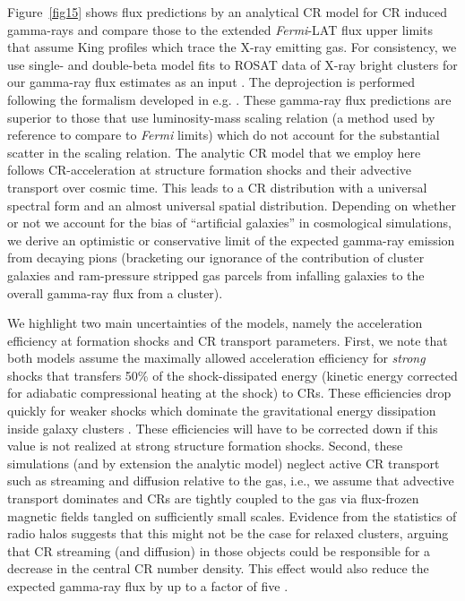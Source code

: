 \documentclass[10pt,aps,pra,reprint,amsmath,amsfonts,amssymb,showpacs,nofootinbib,floatfix]{revtex4-1}
\newcommand{\Fermi}{{\em Fermi}\xspace}
\begin{document}
Figure~\ref{fig15} shows flux predictions by an analytical CR model
\cite{2010MNRAS.409..449P} for CR induced gamma-rays and compare those
to the extended \Fermi-LAT flux upper limits that assume King profiles
which trace the X-ray emitting gas. For consistency, we use single-
and double-beta model fits to ROSAT data of X-ray bright clusters for
our gamma-ray flux estimates as an input
\cite{2007A&A...466..805C}. The deprojection is performed following
the formalism developed in e.g. \cite{2004A&A...413...17P}. These
gamma-ray flux predictions are superior to those that use
luminosity-mass scaling relation (a method used by reference
\cite{2010ApJ...717L..71A} to compare to \Fermi limits) which do not
account for the substantial scatter in the scaling relation. The
analytic CR model that we employ here follows CR-acceleration at
structure formation shocks and their advective transport over cosmic
time. This leads to a CR distribution with a universal spectral form
and an almost universal spatial distribution. Depending on whether or
not we account for the bias of ``artificial galaxies'' in cosmological
simulations, we derive an optimistic or conservative limit of the
expected gamma-ray emission from decaying pions (bracketing our
ignorance of the contribution of cluster galaxies and ram-pressure
stripped gas parcels from infalling galaxies to the overall gamma-ray
flux from a cluster).

We highlight two main uncertainties of the models, namely the
acceleration efficiency at formation shocks and CR transport
parameters. First, we note that both models assume the maximally
allowed acceleration efficiency for {\em strong} shocks that transfers
50\% of the shock-dissipated energy (kinetic energy corrected for
adiabatic compressional heating at the shock) to CRs. These
efficiencies drop quickly for weaker shocks \cite{2007A&A...473...41E}
which dominate the gravitational energy dissipation inside galaxy
clusters \cite{2006MNRAS.367..113P}. These efficiencies will have to
be corrected down if this value is not realized at strong structure formation
shocks. Second, these simulations (and by extension the analytic
model) neglect active CR transport such as streaming and diffusion
relative to the gas, i.e., we assume that advective transport
dominates and CRs are tightly coupled to the gas via flux-frozen
magnetic fields tangled on sufficiently small scales. Evidence from
the statistics of radio halos suggests that this might not be the case
for relaxed clusters, arguing that CR streaming (and diffusion) in
those objects could be responsible for a decrease in the central CR
number density. This effect would also reduce the expected gamma-ray
flux by up to a factor of five \cite{2011A&A...527A..99E}.
\end{document}
